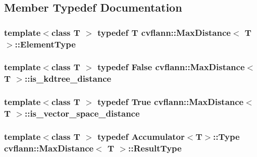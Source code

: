 \subsection{Member Typedef Documentation}
\hypertarget{structcvflann_1_1MaxDistance_a56df35de72712b6c97cf3ca7f299449f}{
\subsubsection[{Element\-Type}]{\setlength{\rightskip}{0pt plus 5cm}template$<$class T $>$ typedef {\bf T} {\bf cvflann\-::\-Max\-Distance}$<$ {\bf T} $>$\-::{\bf Element\-Type}}}\label{structcvflann_1_1MaxDistance_a56df35de72712b6c97cf3ca7f299449f}
\hypertarget{structcvflann_1_1MaxDistance_a88f64a88adf9ee4b90f59c3156a172aa}{
\subsubsection[{is\-\_\-kdtree\-\_\-distance}]{\setlength{\rightskip}{0pt plus 5cm}template$<$class T $>$ typedef {\bf False} {\bf cvflann\-::\-Max\-Distance}$<$ {\bf T} $>$\-::{\bf is\-\_\-kdtree\-\_\-distance}}}\label{structcvflann_1_1MaxDistance_a88f64a88adf9ee4b90f59c3156a172aa}
\hypertarget{structcvflann_1_1MaxDistance_a176a0c9d37039a277617e8a8b53e05b4}{
\subsubsection[{is\-\_\-vector\-\_\-space\-\_\-distance}]{\setlength{\rightskip}{0pt plus 5cm}template$<$class T $>$ typedef {\bf True} {\bf cvflann\-::\-Max\-Distance}$<$ {\bf T} $>$\-::{\bf is\-\_\-vector\-\_\-space\-\_\-distance}}}\label{structcvflann_1_1MaxDistance_a176a0c9d37039a277617e8a8b53e05b4}
\hypertarget{structcvflann_1_1MaxDistance_a180605be488b7132a31a86b93071e6a6}{
\subsubsection[{Result\-Type}]{\setlength{\rightskip}{0pt plus 5cm}template$<$class T $>$ typedef {\bf Accumulator}$<${\bf T}$>$\-::Type {\bf cvflann\-::\-Max\-Distance}$<$ {\bf T} $>$\-::{\bf Result\-Type}}}\label{structcvflann_1_1MaxDistance_a180605be488b7132a31a86b93071e6a6}


